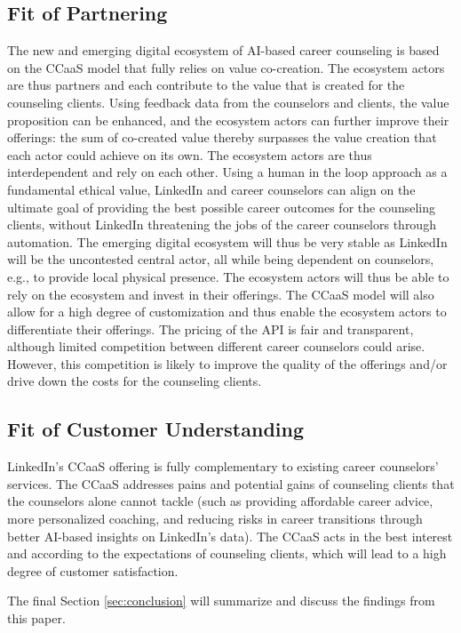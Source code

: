 \subsection{Fit of Partnering}

The new and emerging digital ecosystem of AI-based career counseling is based on the CCaaS model
that fully relies on value co-creation. The ecosystem actors are thus partners and each contribute
to the value that is created for the counseling clients. Using feedback data from the counselors and
clients, the value proposition can be enhanced, and the ecosystem actors can further improve their
offerings: the sum of co-created value thereby surpasses the value creation that each actor could
achieve on its own. The ecosystem actors are thus interdependent and rely on each other. Using a
human in the loop approach as a fundamental ethical value, LinkedIn and career counselors can align
on the ultimate goal of providing the best possible career outcomes for the counseling clients,
without LinkedIn threatening the jobs of the career counselors through automation. The emerging
digital ecosystem will thus be very stable as LinkedIn will be the uncontested central actor, all 
while being dependent on counselors, e.g., to provide local physical presence. The ecosystem actors
will thus be able to rely on the ecosystem and invest in their offerings. The CCaaS model will also
allow for a high degree of customization and thus enable the ecosystem actors to differentiate their
offerings. The pricing of the API is fair and transparent, although limited competition between
different career counselors could arise. However, this competition is likely to improve the quality
of the offerings and/or drive down the costs for the counseling clients. 


\subsection{Fit of Customer Understanding}

LinkedIn's CCaaS offering is fully complementary to existing career counselors' services. The CCaaS
addresses pains and potential gains of counseling clients that the counselors alone cannot tackle 
(such as providing affordable career advice, more personalized coaching, and reducing risks 
in career transitions through better AI-based insights on LinkedIn's data). The CCaaS acts in the
best interest and according to the expectations of counseling clients, which will lead to a high
degree of customer satisfaction.
\newline

\noindent The final Section \ref{sec:conclusion} will summarize and discuss the findings from 
this paper.
